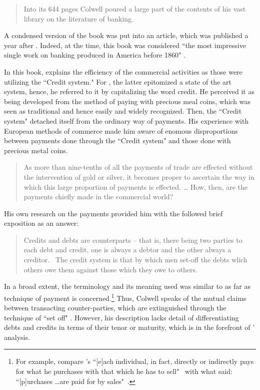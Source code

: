 \begin{quote}
Into its 644 pages Colwell poured a large part of the contents of his vast library on the literature of banking.~\citep[p.~819]{dorfman2}
\end{quote}

A condensed version of the book was put into an article, which was published a year after  \citep{colwell1860}. Indeed, at the time, this book was considered ``the most impressive single work on banking produced in America before 1860" \citep[p.~494]{selgin1989}. 

In this book, \cite{colwell1859,colwell1860} explains the efficiency of the commercial activities as those were utilizing the ``Credit system." For \citeauthor{colwell1859}, the latter epitomized a state of the art system, hence, he referred to it by capitalizing the word credit. He perceived it as being developed from the method of paying with precious meal coins, which was seen as traditional and hence easily and widely recognized. Then, the ``Credit system" detached itself from the ordinary way of payments. His experience with European methods of commerce made him aware of enomous disproportions between payments done through the ``Credit system" and those done with precious metal coins.

\begin{quote}
As more than nine-tenths of all the payments of trade are effected 
without the intervention of gold or silver, it becomes proper to ascertain 
the way in which this large proportion of payments is effected. \dots 
How, then, are the payments chiefly made in the commercial world?~\citep[p.~685]{colwell1860}
\end{quote}

His own research on the payments provided him with the followed brief exposition as an answer:

\begin{quote}
Credits and debts are counterparts -- that is, there being two parties to each debt and 
credit, one is always a debtor and the other always a creditor.~\citep[p.~688]{colwell1860}
The credit system is that by which men set-off the debts wlich others owe them against those which they owe to others.~\citep[p.~8]{colwell1859} 
\end{quote}

In a broad extent, the terminology and its meaning used \citeauthor{colwell1859} was similar to \citeauthor{innes1913} as far as technique of payment is concerned.\footnote{For example, compare \citeauthor{colwell1859}'s ``[e]ach individual, in fact, directly or indirectly pays for what he purchases with that which he has to sell"~\citep[p.~190]{colwell1859} with what \citeauthor{innes1913} said: ``[p]urchases \dots are paid for by sales"~\citep[p.~168]{innes1914}.} Thus, Colwell speaks of the mutual claims between transacting counter-parties, which are extinguished through the technique of ``set off" \citep[p.~693]{colwell1860}. However, his description lacks detail of differentiating debts and credits in terms of their tenor or maturity, which is in the forefront of \citeauthor{innes1913}' analysis.

